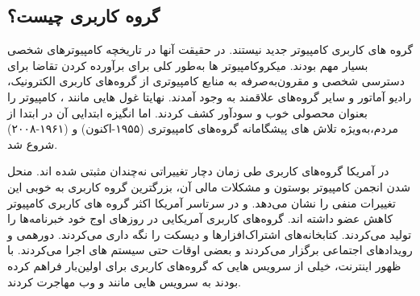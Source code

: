 \subsection{گروه کاربری چیست؟}

گروه های کاربری کامپیوتر جدید نیستند. در حقیقت آنها در تاریخچه کامپیوترهای شخصی
بسیار مهم بودند. میکروکامپیوتر ها به‌طور کلی برای برآورده کردن تقاضا برای دسترسی شخصی
و مقرون‌به‌صرفه به منابع کامپیوتری از گروه‌های کاربری الکترونیک، رادیو آماتور و سایر گروه‌های
علاقمند به وجود آمدند. نهایتا غول هایی مانند
،
کامپیوتر را بعنوان محصولی خوب و سودآور
کشف کردند. اما انگیزه ابتدایی آن در ابتدا از مردم،‌به‌ویژه تلاش های پیشگامانه
گروه‌های کامپیوتری  (۱۹۵۵-اکنون) و  (۱۹۶۱-۲۰۰۸) شروع شد.

در آمریکا گروه‌های کاربری طی زمان دچار تغییراتی نه‌چندان مثبتی شده اند.
منحل شدن انجمن کامپیوتر بوستون
و مشکلات مالی آن، بزرگترین گروه کاربری به خوبی این تغییرات منفی را نشان می‌دهد.
و در سرتاسر آمریکا اکثر گروه های کاربری کامپیوتر کاهش عضو داشته اند.
گروه‌های کاربری آمریکایی در روزهای اوج خود خبرنامه‌ها را تولید می‌کردند.
کتابخانه‌های اشتراک‌افزارها و دیسکت را نگه داری می‌کردند.
دورهمی و رویدادهای اجتماعی برگزار می‌کردند و
بعضی اوقات حتی سیستم های
اجرا می‌کردند. با ظهور اینترنت، خیلی از سرویس هایی که گروه‌های کاربری
برای اولین‌بار فراهم کرده بودند به سرویس هایی مانند
و وب مهاجرت کردند.

